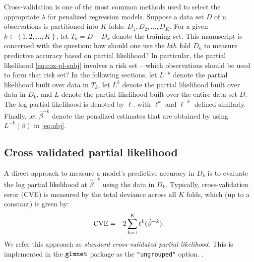\par Cross-validation is one of the most common methods used to select the appropriate $\lambda$ for penalized regression models. Suppose a data set $D$ of n observations is partitioned into $K$ folds: $D_{1}, D_{2}, \ldots, D_{K}$. For a given $k \in \left\{1,2,\ldots, K\right\}$, let $T_{k} = D - D_{k}$ denote the training set. This manuscript is concerned with the question: how should one use the $kth$ fold $D_{k}$ to measure predictive accuracy based on partial likelihood? In particular, the partial likelihood \eqref{eq:cox-pl-subj} involves a risk set -- which observations should be used to form that risk set?  In the following sections, let $L^{-k}$ denote the partial likelihood built over data in $T_k$, let $L^{k}$ denote the partial likelihood built over data in $D_k$, and $L$ denote the partial likelihood built over the entire data set $D$.  The log partial likelihood is denoted by $\ell$, with $\ell^k$ and $\ell^{-k}$ defined similarly. Finally, let $\hat{\beta}^{-k}$ denote the penalized estimates that are obtained by using $L^{-k}(\beta)$ in \eqref{eq:obj}.

\subsection{Cross validated partial likelihood} 
\label{Sec:cox-cv-existing}

\par A direct approach to measure a model's predictive accuracy in $D_k$ is to evaluate the log partial likelihood at $\hat{\beta}^{-k}$ using the data in $D_k$. Typically, cross-validation error (CVE) is measured by the total deviance across all $K$ folds, which (up to a constant) is given by:
\begin{equation}
  \label{eq:standard}
  \textrm{CVE} = -2 \sum_{k=1}^{K} \ell^{k}(\hat{\beta}^{-k}).
\end{equation}
We refer this approach as \emph{standard cross-validated partial likelihood}. This is implemented in the $\tt{glmnet}$ package as the \verb|"ungrouped"| option. .

